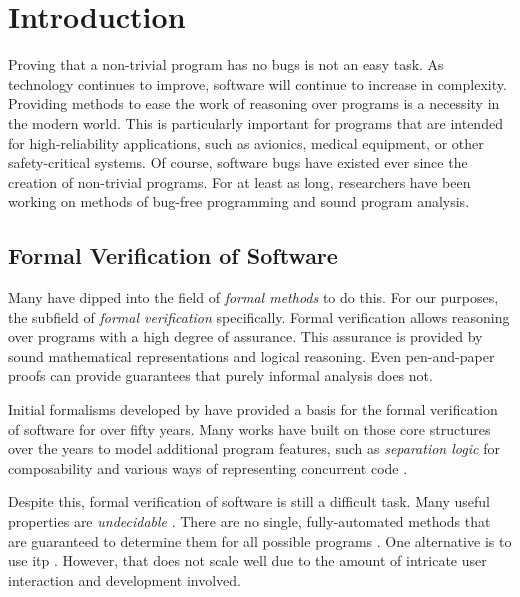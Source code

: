 \chapter{Introduction}\label{introduction}
Proving that a non-trivial program has no bugs is not an easy task.
As technology continues to improve, software will continue to increase in complexity.
Providing methods to ease the work of reasoning over programs is a necessity in the modern world.
This is particularly important for programs that are intended for high-reliability applications,
such as avionics, medical equipment, or other safety-critical systems.
Of course, software bugs have existed ever since the creation of non-trivial programs.
For at least as long, researchers have been working on methods of bug-free programming and sound program analysis.

\section{Formal Verification of Software}
Many have dipped into the field of \emph{formal methods} \autocite{butler:fm} to do this.
For our purposes, the subfield of \emph{formal verification} specifically.
Formal verification allows reasoning over programs with a high degree of assurance.
This assurance is provided by sound mathematical representations and logical reasoning.
Even pen-and-paper proofs can provide guarantees that purely informal analysis does not.

Initial formalisms developed by \textcite{floyd1967assigning,hoare1969axiomatic} have provided a basis for the formal verification of software for over fifty years.
Many works have built on those core structures over the years to model additional program features, such as \emph{separation logic} \autocite{reynolds2002separation} for composability and various ways of representing concurrent code \autocite{owicki1976gries,xu1997rely-guarantee}.

Despite this, formal verification of software is still a difficult task.
Many useful properties are \emph{undecidable} \autocite{rice1953classes,horspool1980approach,ouimet2008formal}.
There are no single, fully-automated methods that are guaranteed to determine them for all possible programs \autocite{bonacina2010theoremproving}.
One alternative is to use \ac{itp} \autocite{harrison2014itp,maric2015itp,schopf2018itp}.
However, that does not scale well due to the amount of intricate user interaction and development involved.

